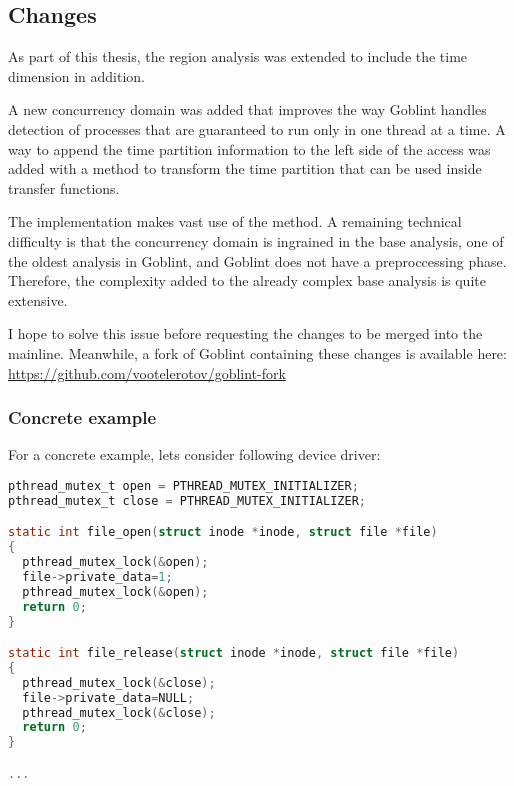 \documentclass[..thesis.tex]{subfiles}
\begin{document}

\subsection{Changes}


As part of this thesis, the region analysis was extended to include the time dimension in addition.

A new concurrency domain was added that improves the way Goblint handles detection of processes that are guaranteed to run only in one thread at a time.
A way to append the time partition information to the left side of the access was added with a method to transform the time partition that can be used inside transfer functions. 

The implementation makes vast use of the  method. A remaining technical difficulty is that the concurrency domain is ingrained in the base analysis,
one of the oldest analysis in Goblint, and Goblint does not have a preproccessing phase. Therefore, the complexity added to the already complex base analysis is quite extensive.

I hope to solve this issue before requesting the changes to be merged into the mainline.
Meanwhile, a fork of Goblint containing these changes is available here: \url{https://github.com/vootelerotov/goblint-fork}



\subsubsection{Concrete example}

For a concrete example, lets consider following device driver:

\begin{lstlisting}[language=c,style=def,columns=fullflexible]
pthread_mutex_t open = PTHREAD_MUTEX_INITIALIZER;
pthread_mutex_t close = PTHREAD_MUTEX_INITIALIZER;

static int file_open(struct inode *inode, struct file *file)
{
  pthread_mutex_lock(&open);
  file->private_data=1; 
  pthread_mutex_lock(&open);
  return 0;
}

static int file_release(struct inode *inode, struct file *file)
{
  pthread_mutex_lock(&close);
  file->private_data=NULL; 
  pthread_mutex_lock(&close);
  return 0;
}

...
\end{lstlisting}
\end{document}
